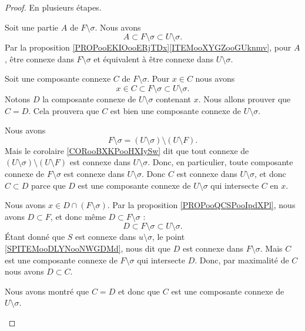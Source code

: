 \begin{proof}
	En plusieurs étapes.
	\begin{subproof}
				\label{SPITEMooDLYNooNWGDMd}
		Soit une partie \( A\) de \( F\setminus \sigma\). Nous avons
		\begin{equation}
			A\subset F\setminus \sigma\subset U\setminus \sigma.
		\end{equation}
		Par la proposition \ref{PROPooEKIOooERjTDx}\ref{ITEMooXYGZooGUknmv}, pour \( A\), être connexe dans \( F\setminus \sigma\) et équivalent à être connexe dans \( U\setminus \sigma\).

		Soit une composante connexe \( C\) de \( F\setminus \sigma\). Pour \( x\in C\) nous avons
		\begin{equation}
			x\in C\subset F\setminus \sigma\subset U\setminus \sigma.
		\end{equation}
		Notons \( D\) la composante connexe de \( U\setminus \sigma\) contenant \( x\). Nous allons prouver que \( C=D\). Cela prouvera que \( C\) est bien une composante connexe de \( U\setminus \sigma\).

		\spitem[\( C\subset D\)]
		Nous avons
		\begin{equation}
			F\setminus \sigma=(U\setminus \sigma)\setminus(U\setminus F).
		\end{equation}
		Mais le corolaire \ref{CORooBXKPooHXIySw} dit que tout connexe de \( (U\setminus\sigma)\setminus(U\setminus F)\) est connexe dans \( U\setminus \sigma\). Donc, en particulier, toute composante connexe de \( F\setminus \sigma\) est connexe dans \( U\setminus \sigma\). Donc \( C\) est connexe dans \( U\setminus \sigma\), et donc \( C\subset D\) parce que \( D\) est une composante connexe de \( U\setminus\sigma\) qui intersecte \( C\) en \( x\).

		\spitem[\( D\subset C\)]
		Nous avons \( x\in D\cap(F\setminus \sigma)\). Par la proposition \ref{PROPooQCSPooIpdXPl}, nous avons \( D\subset F\), et donc même \( D\subset F\setminus \sigma\) :
		\begin{equation}
			D\subset F\setminus \sigma\subset U\setminus \sigma.
		\end{equation}
		Étant donné que \( S\) est connexe dans \( u\setminus\sigma\), le point \ref{SPITEMooDLYNooNWGDMd}, nous dit que \( D\) est connexe dans \( F\setminus \sigma\). Mais \( C\) est une composante connexe de \( F\setminus\sigma\) qui intersecte \( D\). Donc, par maximalité de \( C\) nous avons \( D\subset C\).

		\spitem[Conclusion]
		Nous avons montré que \( C=D\) et donc que \( C\) est une composante connexe de \( U\setminus \sigma\).
	\end{subproof}
\end{proof}

